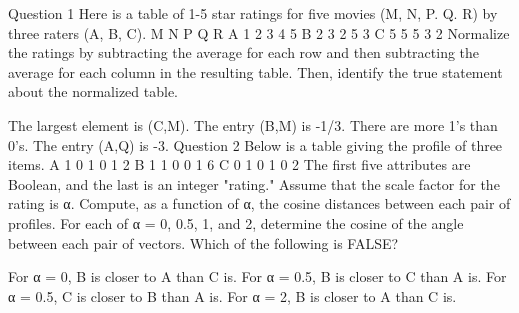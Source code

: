 Question 1
Here is a table of 1-5 star ratings for five movies (M, N, P. Q. R) by three raters (A, B, C).
M	N	P	Q	R
A	1	2	3	4	5
B	2	3	2	5	3
C	5	5	5	3	2
Normalize the ratings by subtracting the average for each row and then subtracting the average for each column in the resulting table. Then, identify the true statement about the normalized table.

The largest element is (C,M).
The entry (B,M) is -1/3.
There are more 1's than 0's.
The entry (A,Q) is -3.
Question 2
Below is a table giving the profile of three items.
A	1	0	1	0	1	2
B	1	1	0	0	1	6
C	0	1	0	1	0	2
The first five attributes are Boolean, and the last is an integer "rating." Assume that the scale factor for the rating is α. Compute, as a function of α, the cosine distances between each pair of profiles. For each of α = 0, 0.5, 1, and 2, determine the cosine of the angle between each pair of vectors. Which of the following is FALSE?

For α = 0, B is closer to A than C is.
For α = 0.5, B is closer to C than A is.
For α = 0.5, C is closer to B than A is.
For α = 2, B is closer to A than C is.
